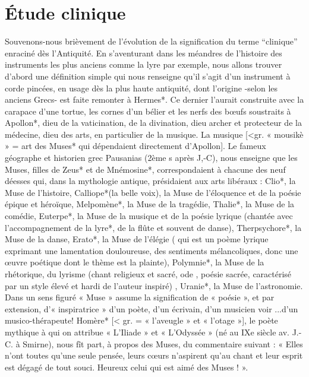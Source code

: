 \chapter[\'Etude clinique]{\'Etude clinique}

Souvenons-nous brièvement de l'évolution de la signification du terme
``clinique'' enraciné dès l'Antiquité.
En s’aventurant dans les méandres de l’histoire des instruments les plus anciens comme la lyre par exemple, nous allons trouver d’abord une définition simple qui nous renseigne qu’il s’agit d’un instrument à corde pincées, en usage dès la plus haute antiquité, dont l’origine -selon les anciens Grecs- est faite remonter à Hermes*.
Ce dernier l’aurait construite avec la carapace d’une tortue, les cornes d’un bélier et les nerfs des bœufs soustraits à Apollon*, dieu de la vaticination, de la divination, dieu archer et protecteur de la médecine, dieu des arts, en particulier de la musique.
La musique [<gr. « mousikè » = art des Muses* qui dépendaient directement d’Apollon].
Le fameux géographe et historien grec Pausanias (2ème s après J,-C), nous enseigne que les Muses, filles de Zeus* et de Mnémosine*, correspondaient à chacune des neuf déesses qui, dans la mythologie antique, présidaient aux arts libéraux : Clio*, la Muse de l’histoire, Calliope*(la belle voix), la Muse de l’éloquence et de la poésie épique et héroïque, Melpomène*, la Muse de la tragédie, Thalie*, la Muse de la comédie, Euterpe*, la Muse de la musique et de la poésie lyrique (chantée avec l’accompagnement de la lyre*, de la flûte et souvent de danse), Therpsychore*, la Muse de la danse, Erato*, la Muse de l’élégie ( qui est un poème lyrique exprimant une lamentation douloureuse, des sentiments mélancoliques, donc une œuvre poétique dont le thème est la plainte), Polymnie*, la Muse de la rhétorique, du lyrisme (chant religieux et sacré, ode , poésie sacrée, caractérisé par un style élevé et hardi de l’auteur inspiré) , Uranie*, la Muse de l’astronomie.
Dans un sens figuré « Muse » assume la signification de « poésie », et par extension, d’« inspiratrice » d’un poète, d’un écrivain, d’un musicien voir ...d’un musico-thérapeute!
Homère* [< gr. = « l’aveugle » et « l’otage »], le poète mythique à qui on attribue « L’Iliade » et « L’Odyssée » (né au IXe siècle av. J.-C. à Smirne), nous fît part, à propos des Muses, du commentaire suivant : « Elles n’ont toutes qu’une seule pensée, leurs cœurs n’aspirent qu’au chant et leur esprit est dégagé de tout souci. Heureux celui qui est aimé des Muses ! ».



